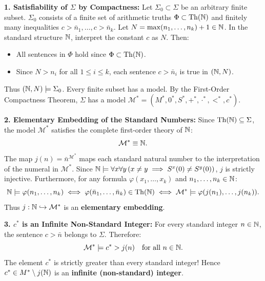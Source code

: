 \begin{tabletworkspace}[5.0cm]
\end{tabletworkspace}

\begin{solution}
\textbf{1. Satisfiability of $\Sigma$ by Compactness:}
Let $\Sigma_0 \subset \Sigma$ be an arbitrary finite subset.
$\Sigma_0$ consists of a finite set of arithmetic truths $\Phi \subset \mathrm{Th}(\mathbb{N})$ and finitely many inequalities $c > \bar{n}_1, \dots, c > \bar{n}_k$.
Let $N = \max(n_1, \dots, n_k) + 1 \in \mathbb{N}$.
In the standard structure $\mathbb{N}$, interpret the constant $c$ as $N$.
Then:
\begin{itemize}[leftmargin=1.4em,itemsep=2pt]
  \item All sentences in $\Phi$ hold since $\Phi \subset \mathrm{Th}(\mathbb{N})$.
  \item Since $N > n_i$ for all $1 \le i \le k$, each sentence $c > \bar{n}_i$ is true in $(\mathbb{N}, N)$.
\end{itemize}
Thus $(\mathbb{N}, N) \models \Sigma_0$. Every finite subset has a model.
By the First-Order Compactness Theorem, $\Sigma$ has a model $\mathcal{M}^* = (M^*, 0^*, S^*, +^*, \cdot^*, <^*, c^*)$.

\textbf{2. Elementary Embedding of the Standard Numbers:}
Since $\mathrm{Th}(\mathbb{N}) \subseteq \Sigma$, the model $\mathcal{M}^*$ satisfies the complete first-order theory of $\mathbb{N}$:
\[
\mathcal{M}^* \equiv \mathbb{N}.
\]
The map $j(n) = \bar{n}^{\mathcal{M}^*}$ maps each standard natural number to the interpretation of the numeral in $\mathcal{M}^*$.
Since $\mathbb{N} \models \forall x \forall y\, (x \ne y \implies S^x(0) \ne S^y(0))$, $j$ is strictly injective.
Furthermore, for any formula $\varphi(x_1, \dots, x_k)$ and $n_1, \dots, n_k \in \mathbb{N}$:
\[
\mathbb{N} \models \varphi(n_1, \dots, n_k) \iff \varphi(\bar{n}_1, \dots, \bar{n}_k) \in \mathrm{Th}(\mathbb{N}) \iff \mathcal{M}^* \models \varphi(j(n_1), \dots, j(n_k)).
\]
Thus $j: \mathbb{N} \hookrightarrow \mathcal{M}^*$ is an \textbf{elementary embedding}.

\textbf{3. $c^*$ is an Infinite Non-Standard Integer:}
For every standard integer $n \in \mathbb{N}$, the sentence $c > \bar{n}$ belongs to $\Sigma$.
Therefore:
\[
\mathcal{M}^* \models c^* > j(n) \quad \text{for all } n \in \mathbb{N}.
\]
The element $c^*$ is strictly greater than every standard integer!
Hence $c^* \in M^* \setminus j(\mathbb{N})$ is an \textbf{infinite (non-standard) integer}.


\end{solution}
